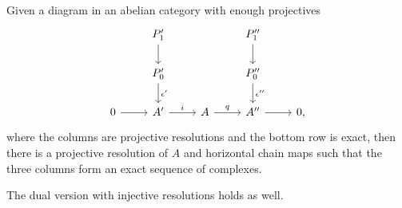 \documentclass[english,letterpaper]{article}%
\numberwithin{equation}{section}
\numberwithin{figure}{section}
\numberwithin{table}{section}
\theoremstyle{definition}
\theoremstyle{definition}
\theoremstyle{definition}
\theoremstyle{plain}
\theoremstyle{plain}
\theoremstyle{plain}
\theoremstyle{plain}
\theoremstyle{remark}
\theoremstyle{remark}
\begin{document}
\begin{lem}
    Given a diagram in an abelian category with enough projectives
    \[\begin{tikzcd}
        & P_1'\ar[d] && P_1''\ar[d]& \\
        & P_0'\ar[d,"\epsilon'"] && P_0''\ar[d,"\epsilon ''"]& \\
       0\arrow[r] & A'\arrow[r,"i"] & A\arrow[r,"q"] & A'' \arrow[r] &0,
    \end{tikzcd}\]
    where the columns are projective resolutions and the bottom row is exact, then there is a projective resolution of $A$ and horizontal chain maps such that the three columns form an exact sequence of complexes.
    
    The dual version with injective resolutions holds as well.
\end{lem}
\end{document}
